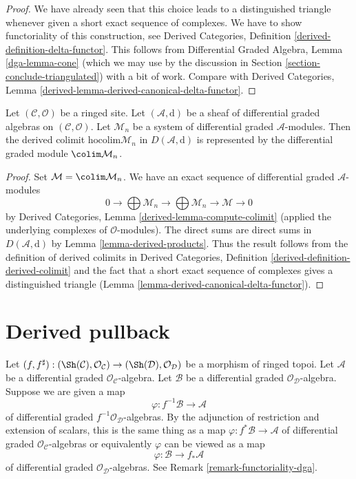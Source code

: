 \begin{proof}
We have already seen that this choice leads to a distinguished
triangle whenever given a short exact sequence of complexes.
We have to show functoriality of this construction, see
Derived Categories, Definition \ref{derived-definition-delta-functor}.
This follows from Differential Graded Algebra, Lemma \ref{dga-lemma-cone}
(which we may use by the discussion in
Section \ref{section-conclude-triangulated}) with a bit of
work. Compare with
Derived Categories, Lemma \ref{derived-lemma-derived-canonical-delta-functor}.
\end{proof}

\begin{lemma}
\label{lemma-homotopy-colimit}
Let $(\mathcal{C}, \mathcal{O})$ be a ringed site. Let
$(\mathcal{A}, \text{d})$ be a sheaf of differential graded algebras
on $(\mathcal{C}, \mathcal{O})$. Let
$\mathcal{M}_n$ be a system of differential graded $\mathcal{A}$-modules.
Then the derived colimit $\text{hocolim} \mathcal{M}_n$ in
$D(\mathcal{A}, \text{d})$ is represented
by the differential graded module $\colim \mathcal{M}_n$.
\end{lemma}

\begin{proof}
Set $\mathcal{M} = \colim \mathcal{M}_n$.
We have an exact sequence of differential graded $\mathcal{A}$-modules
$$
0 \to \bigoplus \mathcal{M}_n \to \bigoplus \mathcal{M}_n \to \mathcal{M} \to 0
$$
by Derived Categories, Lemma \ref{derived-lemma-compute-colimit}
(applied the underlying complexes of $\mathcal{O}$-modules).
The direct sums are direct sums in $D(\mathcal{A}, \text{d})$ by
Lemma \ref{lemma-derived-products}.
Thus the result follows from the definition
of derived colimits in Derived Categories,
Definition \ref{derived-definition-derived-colimit}
and the fact that a short exact sequence of complexes
gives a distinguished triangle
(Lemma \ref{lemma-derived-canonical-delta-functor}).
\end{proof}






\section{Derived pullback}
\label{section-derived-pullback}

\noindent
Let $(f, f^\sharp) : (\Sh(\mathcal{C}), \mathcal{O}_\mathcal{C})
\to (\Sh(\mathcal{D}), \mathcal{O}_\mathcal{D})$
be a morphism of ringed topoi. Let $\mathcal{A}$ be a differential
graded $\mathcal{O}_\mathcal{C}$-algebra. Let $\mathcal{B}$ be a
differential graded $\mathcal{O}_\mathcal{D}$-algebra.
Suppose we are given a map
$$
\varphi : f^{-1}\mathcal{B} \to \mathcal{A}
$$
of differential graded $f^{-1}\mathcal{O}_\mathcal{D}$-algebras.
By the adjunction of restriction and extension of scalars, this
is the same thing as a map $\varphi : f^*\mathcal{B} \to \mathcal{A}$
of differential graded $\mathcal{O}_\mathcal{C}$-algebras or equivalently
$\varphi$ can be viewed as a map
$$
\varphi : \mathcal{B} \to f_*\mathcal{A}
$$
of differential graded $\mathcal{O}_\mathcal{D}$-algebras.
See Remark \ref{remark-functoriality-dga}.

